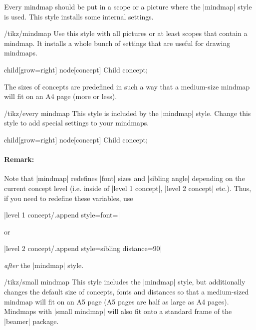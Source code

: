 Every mindmap should be put in a scope or a picture where the |mindmap| style
is used. This style installs some internal settings.

\begin{stylekey}{/tikz/mindmap}
    Use this style with all pictures or at least scopes that contain a mindmap.
    It installs a whole bunch of settings that are useful for drawing mindmaps.
\begin{codeexample}[preamble={\usetikzlibrary{mindmap}}]
\tikz[mindmap,concept color=red!50]
    child[grow=right] {node[concept] {Child concept}};
\end{codeexample}
    The sizes of concepts are predefined in such a way that a medium-size
    mindmap will fit on an A4 page (more or less).
    \begin{stylekey}{/tikz/every mindmap}
        This style is included by the |mindmap| style. Change this style to add
        special settings to your mindmaps.
\begin{codeexample}[preamble={\usetikzlibrary{mindmap}}]
\tikz[large mindmap,concept color=red!50]
    child[grow=right] {node[concept] {Child concept}};
\end{codeexample}
    \end{stylekey}

    \paragraph{Remark:}
    Note that |mindmap| redefines |font| sizes and |sibling angle| depending on
    the current concept level (i.e. inside of |level 1 concept|,
    |level 2 concept| etc.). Thus, if you need to redefine these variables, use

    |level 1 concept/.append style={font=\small}|

    \noindent or

    |level 2 concept/.append style={sibling distance=90}|

    \noindent \emph{after} the |mindmap| style.
\end{stylekey}

\begin{stylekey}{/tikz/small mindmap}
    This style includes the |mindmap| style, but additionally changes the
    default size of concepts, fonts and distances so that a medium-sized
    mindmap will fit on an A5 page (A5 pages are half as large as A4 pages).
    Mindmaps with |small mindmap| will also fit onto a standard frame of the
    |beamer| package.
\end{stylekey}

